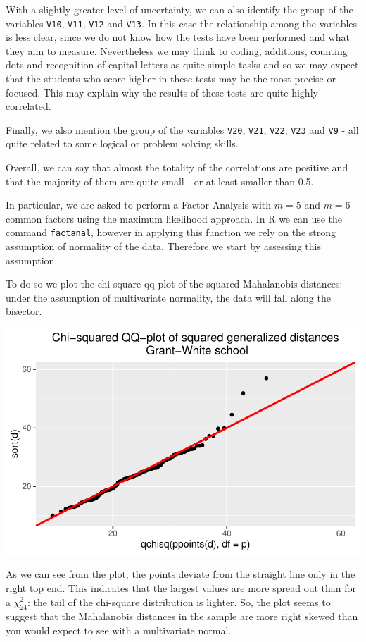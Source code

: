 \documentclass[
  letterpaper,
  DIV=11,
  numbers=noendperiod]{scrartcl}
\begin{document}
With a slightly greater level of uncertainty, we can also identify the
group of the variables \texttt{V10}, \texttt{V11}, \texttt{V12} and
\texttt{V13}. In this case the relationship among the variables is less
clear, since we do not know how the tests have been performed and what
they aim to measure. Nevertheless we may think to coding, additions,
counting dots and recognition of capital letters as quite simple tasks
and so we may expect that the students who score higher in these tests
may be the most precise or focused. This may explain why the results of
these tests are quite highly correlated.

Finally, we also mention the group of the variables \texttt{V20},
\texttt{V21}, \texttt{V22}, \texttt{V23} and \texttt{V9} - all quite
related to some logical or problem solving skills.

Overall, we can say that almost the totality of the correlations are
positive and that the majority of them are quite small - or at least
smaller than 0.5.

In particular, we are asked to perform a Factor Analysis with \(m=5\)
and \(m=6\) common factors using the maximum likelihood approach. In R
we can use the command \texttt{factanal}, however in applying this
function we rely on the strong assumption of normality of the data.
Therefore we start by assessing this assumption.

To do so we plot the chi-square qq-plot of the squared Mahalanobis
distances: under the assumption of multivariate normality, the data will
fall along the bisector.

\includegraphics{ProblemSet2_files/figure-pdf/unnamed-chunk-9-1.pdf}

As we can see from the plot, the points deviate from the straight line
only in the right top end. This indicates that the largest values are
more spread out than for a \(\chi_{24}^2\): the tail of the chi-square
distribution is lighter. So, the plot seems to suggest that the
Mahalanobis distances in the sample are more right skewed than you would
expect to see with a multivariate normal.
\end{document}
